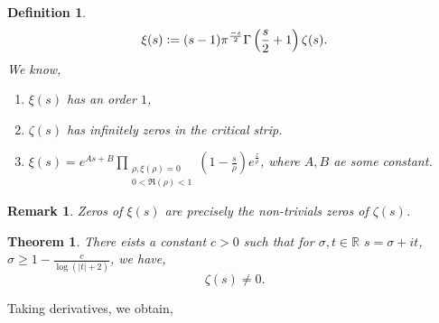 \documentclass{article}
\newtheorem{theorem}{Theorem} [section]
\newtheorem{definition}{Definition}[section]
\newtheorem{remark}{Remark}[section]
\newcommand{\defeq}{\vcentcolon=}
\newcommand{\R}[0]{\mathbb{R}}
\begin{document}
\begin{definition}
  \begin{equation*}
    \xi(s)\defeq (s-1)\pi^{{\frac {-s} {2}}}\Gamma\left({\frac s 2}+1\right)\zeta(s).
  \end{equation*}
  We know,
  \begin{enumerate}
    \item $\xi(s)$ has an order $1$,
    \item $\zeta(s)$ has infinitely zeros in the critical strip.
    \item $\xi(s) = e^{As+B}\prod_{\substack{\rho,\xi(\rho)=0\\ 0<\Re(\rho)<1}}\left(1-{\frac s \rho}\right)e^{{\frac z \rho}}$, where $A,B$ ae some constant.
  \end{enumerate}
\end{definition}

\begin{remark}
  Zeros of $\xi(s)$ are precisely the non-trivials zeros of $\zeta(s)$.
\end{remark}

\begin{theorem}
  There eists a constant $c>0$ such that for $\sigma,t\in\R$ $s = \sigma+it$, $\sigma\geq 1-{\frac {c} {\log(\vert t\vert+2)}}$, we have,
  \begin{equation*}
    \zeta(s)\not=0.
  \end{equation*}
\end{theorem}

Taking derivatives, we obtain,
\end{document}
